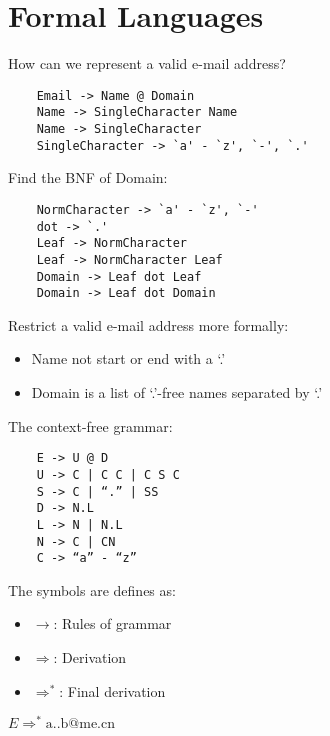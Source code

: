 \section{Formal Languages}

How can we represent a valid e-mail address?

\begin{verbatim}
    Email -> Name @ Domain
    Name -> SingleCharacter Name
    Name -> SingleCharacter
    SingleCharacter -> `a' - `z', `-', `.'
\end{verbatim}

Find the BNF of Domain:

\begin{verbatim}
    NormCharacter -> `a' - `z', `-'
    dot -> `.'
    Leaf -> NormCharacter
    Leaf -> NormCharacter Leaf
    Domain -> Leaf dot Leaf
    Domain -> Leaf dot Domain
\end{verbatim}

Restrict a valid e-mail address more formally:

\begin{itemize}
\item
  Name not start or end with a `.'
\item
  Domain is a list of `.'-free names separated by `.'
\end{itemize}

The context-free grammar:

\begin{verbatim}
    E -> U @ D
    U -> C | C C | C S C
    S -> C | “.” | SS
    D -> N.L
    L -> N | N.L
    N -> C | CN
    C -> “a” - “z”
\end{verbatim}

\begin{definition}[Symbols]
The symbols are defines as:
\begin{itemize}
    \item $\rightarrow$: Rules of grammar
    \item $\Rightarrow$: Derivation
    \item $\Rightarrow^*$: Final derivation
\end{itemize}
\end{definition}


\(E \Rightarrow^* \text{a..b@me.cn}\)

